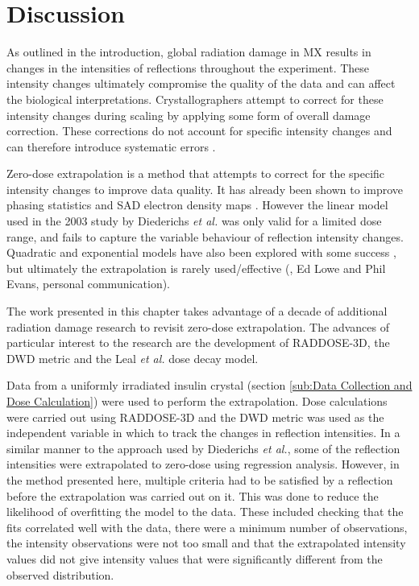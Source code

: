 \section{Discussion}
\label{sec:Discussion - Zero-dose extrapolation}
As outlined in the introduction, global radiation damage in MX results in changes in the intensities of reflections throughout the experiment.
These intensity changes ultimately compromise the quality of the data and can affect the biological interpretations.
Crystallographers attempt to correct for these intensity changes during scaling by applying some form of overall damage correction.
These corrections do not account for specific intensity changes and can therefore introduce systematic errors \cite{diederichs2003}.

Zero-dose extrapolation is a method that attempts to correct for the specific intensity changes to improve data quality.
It has already been shown to improve phasing statistics and SAD electron density maps \cite{diederichs2003}.
However the linear model used in the 2003 study by Diederichs \textit{et al.} was only valid for a limited dose range, and fails to capture the variable behaviour of reflection intensity changes.
Quadratic and exponential models have also been explored with some success \cite{diederichs2006}, but ultimately the extrapolation is rarely used/effective (\cite{borek2007many}, Ed Lowe and Phil Evans, personal communication).

The work presented in this chapter takes advantage of a decade of additional radiation damage research to revisit zero-dose extrapolation.
The advances of particular interest to the research are the development of RADDOSE-3D, the DWD metric and the Leal \textit{et al.}  dose decay model.

Data from a uniformly irradiated insulin crystal (section \ref{sub:Data Collection and Dose Calculation}) were used to perform the extrapolation.
Dose calculations were carried out using RADDOSE-3D and the DWD metric was used as the independent variable in which to track the changes in reflection intensities.
In a similar manner to the approach used by Diederichs \textit{et al.}, some of the reflection intensities were extrapolated to zero-dose using regression analysis.
However, in the method presented here, multiple criteria had to be satisfied by a reflection before the extrapolation was carried out on it.
This was done to reduce the likelihood of overfitting the model to the data.
These included checking that the fits correlated well with the data, there were a minimum number of observations, the intensity observations were not too small and that the extrapolated intensity values did not give intensity values that were significantly different from the observed distribution.

